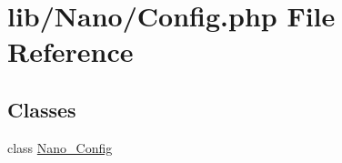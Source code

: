 \hypertarget{Config_8php}{
\section{lib/Nano/Config.php File Reference}
\label{Config_8php}
}
\subsection*{Classes}
\begin{CompactItemize}
\item 
class \hyperlink{classNano__Config}{Nano\_\-Config}
\end{CompactItemize}
